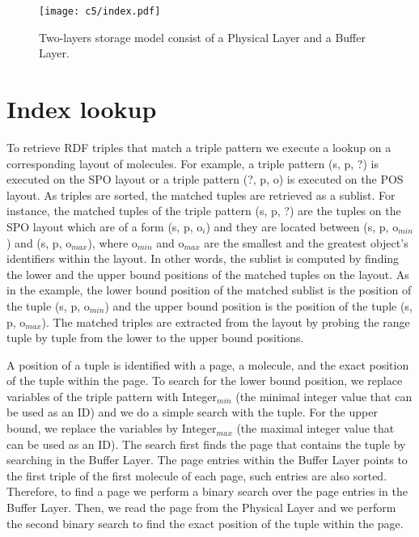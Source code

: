 \begin{figure}[ht!]
\centering
\texttt{[image: c5/index.pdf]}
\caption{Two-layers storage model consist of a Physical Layer and a Buffer Layer.}
\label{fig:index}
\end{figure}

\section{Index lookup} 

To retrieve RDF triples that match a triple pattern we execute a lookup on a corresponding layout of molecules. For example, a triple pattern (s, p, ?) is executed on the SPO layout or a triple pattern (?, p, o) is executed on the POS layout. As triples are sorted, the matched tuples are retrieved as a sublist. For instance, the matched tuples of the triple pattern (s, p, ?) are the tuples on the SPO layout which are of a form (s, p, o$_{i}$) and they are located between (s, p, o$_{min}$) and (s, p, o$_{max}$), where o$_{min}$ and o$_{max}$ are the smallest and the greatest object's identifiers within the layout. In other words, the sublist is computed by finding the lower and the upper bound positions of the matched tuples on the layout.
As in the example, the lower bound position of the matched sublist is the position of the tuple (s, p, o$_{min}$) and the upper bound position is the position of the tuple (s, p, o$_{max}$).
The matched triples are extracted from the layout by probing the range tuple by tuple from the lower to the upper bound positions. 

A position of a tuple is identified with a page, a molecule, and the exact position of the tuple within the page. To search for the lower bound position, we replace variables of the triple pattern with Integer$_{min}$ (the minimal integer value that can be used as an ID) and we do a simple search with the tuple. For the upper bound, we replace the variables by Integer$_{max}$ (the maximal integer value that can be used as an ID).
The search first finds the page that contains the tuple by searching in the Buffer Layer. 
The page entries within the Buffer Layer points to the first triple of the first molecule of each page, such entries are also sorted. Therefore, to find a page we perform a binary search over the page entries in the Buffer Layer. Then, we read the page from the Physical Layer and we perform the second binary search to find the exact position of the tuple within the page. 

